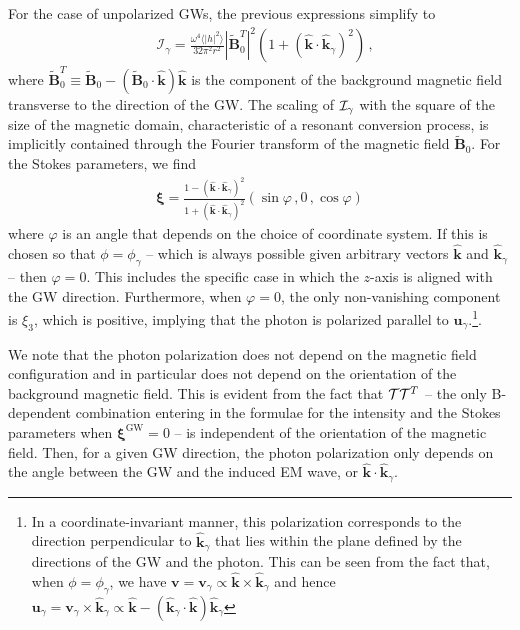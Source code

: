\documentclass[a4paper,11pt]{article}
\begin{document}
For the case of unpolarized GWs, the previous expressions simplify to  
%
\begin{equation}
    \begin{aligned}
    & \mathcal{I}_{\gamma} 
    =  \frac{\omega^{4} \langle \vert h \vert^{2} \rangle}{32\pi^{2} r^{2}}   |\tilde{ \bm{B} }_{0}^{T}  |^{2}   \left( 1 + (\hat{ \bm k}\cdot \hat{ \bm k}_{\gamma})^{2} \right) \,,
    \end{aligned}
\end{equation}
%
where $ \tilde{ \bm{B} }_{0}^{T} \equiv \tilde{ \bm{B} }_{0} - (\tilde{ \bm{B} }_{0} \cdot \hat{\bm k}) \hat{\bm k}  $ is the component of the background magnetic field transverse to the direction of the GW. The scaling of ${\cal I}_\gamma$ with the square of the size of the magnetic domain, characteristic of a resonant conversion process, is implicitly contained through the Fourier transform of the magnetic field $\tilde {\bm B}_{0}$.
%
For the Stokes parameters, we find
%
\begin{align}
    \bm{\xi} = \frac{1 - (\hat{ \bm k}\cdot \hat{ \bm k}_{\gamma})^{2} }{1 + (\hat{ \bm k}\cdot \hat{ \bm k}_{\gamma})^{2}}\left( \sin \varphi \,, 0 \,,  \cos \varphi\right) 
    \label{eq:pol_localized}
\end{align}
%
where $\varphi$ is an angle that depends on the choice of coordinate system.
%
If this is chosen so that $\phi = \phi_\gamma$ -- which is always possible given arbitrary vectors $\hat{\bm k}$ and $\hat{\bm k}_\gamma $ -- then $\varphi=0$.
%
This includes the specific case in which the $z$-axis is aligned with the GW direction.
%
Furthermore, when $\varphi=0$, the only non-vanishing component is  $ \xi_{3}$, which is positive, implying that the photon is polarized parallel to $ \bm{u}_{\gamma}$.\footnote{In a coordinate-invariant manner, this polarization corresponds to the direction perpendicular to $\hat{\bm{k}}_{\gamma}$ that lies within the plane defined by the directions of the GW and the photon.
%
This can be seen from the fact that, when $\phi = \phi_\gamma$, we have ${\bm v} = {\bm v}_\gamma \propto \hat{\bm{k}} \times \hat{\bm{k}}_{\gamma}$ and hence $ \bm{u}_{\gamma} =  {\bm v}_\gamma\times  \hat{\bm{k}}_{\gamma} \propto  \hat{\bm{k}}- (\hat{\bm{k}}_{\gamma} \cdot \hat{\bm{k}} ) \hat{\bm{k}}_{\gamma}  $}. 



We note that the photon polarization does not depend on the magnetic field configuration and in particular does not depend on the orientation of the background magnetic field.
%
This is evident from the fact that ${\cal T}{\cal T}^{T}$ -- the only B-dependent combination entering in the formulae for the intensity and the Stokes parameters when $\bm{\xi}^{\text{GW}} =0 $ -- is independent of the orientation of the magnetic field. 
%
Then, for a given GW direction, 
the photon polarization
only depends on the angle between the GW and the induced EM wave, or $ \hat{\bm k} \cdot \hat{\bm k}_{\gamma} $.
\end{document}
